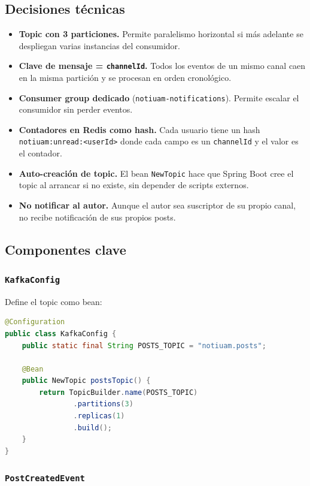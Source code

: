 \subsection{Decisiones técnicas}

\begin{itemize}[leftmargin=*]
  \item \textbf{Topic con 3 particiones.} Permite paralelismo horizontal si más adelante se despliegan varias instancias del consumidor.
  \item \textbf{Clave de mensaje = \texttt{channelId}.} Todos los eventos de un mismo canal caen en la misma partición y se procesan en orden cronológico.
  \item \textbf{Consumer group dedicado} (\texttt{notiuam-notifications}). Permite escalar el consumidor sin perder eventos.
  \item \textbf{Contadores en Redis como hash.} Cada usuario tiene un hash \texttt{notiuam:unread:<userId>} donde cada campo es un \texttt{channelId} y el valor es el contador.
  \item \textbf{Auto-creación de topic.} El bean \texttt{NewTopic} hace que Spring Boot cree el topic al arrancar si no existe, sin depender de scripts externos.
  \item \textbf{No notificar al autor.} Aunque el autor sea suscriptor de su propio canal, no recibe notificación de sus propios posts.
\end{itemize}

\subsection{Componentes clave}

\subsubsection{\texttt{KafkaConfig}}

Define el topic como bean:

\begin{lstlisting}[language=java]
@Configuration
public class KafkaConfig {
    public static final String POSTS_TOPIC = "notiuam.posts";

    @Bean
    public NewTopic postsTopic() {
        return TopicBuilder.name(POSTS_TOPIC)
                .partitions(3)
                .replicas(1)
                .build();
    }
}
\end{lstlisting}

\subsubsection{\texttt{PostCreatedEvent}}


